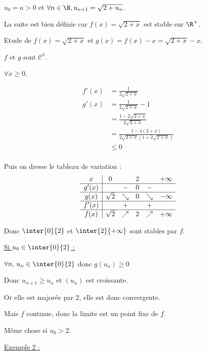 \begin{exemple}
    $u_0 = a > 0$ et $\forall n \in \N, u_{n + 1} = \sqrt{2 + u_n}$. 

    La suite est bien définie car $f(x) = \sqrt{2 + x}$ est stable sur $\R^+$. 

    Etude de $f(x) = \sqrt{2 + x}$ et $g(x)= f(x) - x = \sqrt{2 + x} - x$.

    $f$ et $g$ sont $\mathscr C^1$. 
    
    $\forall x  \geqslant 0,$

    \begin{align*}
        f'(x) & = \frac 1 {2\sqrt{2 + x}} \\
        g'(x) & = \frac 1 {2\sqrt{2 + x}} - 1 \\
        & = \frac{1 - 2 \sqrt{2 + x}}{2 \sqrt{2 + x}} \\
        & = \frac{1 - 4(2 + x)}{2 \sqrt{2 + x}(1 + 2\sqrt{2 + x})} \\
        & \leqslant 0 \\
    \end{align*}
    

    Puis on dresse le tableau de variation :
    \[\begin{array}{c|ccccc}
        x & 0 & & 2 & & +\infty \\
        \hline
        g'(x) & & - & 0 & - & \\
        \hline
        g(x) & \sqrt 2 & \searrow & 0 & \searrow & -\infty \\
        \hline
        f'(x) & \space & + & \space & + & \space \\
        \hline
        f(x) & \sqrt 2 & \nearrow & 2 & \nearrow & +\infty \\
    \end{array}\]

    Donc $\inter{0}{2}$ et $\inter{2}{+\infty}$ sont stables par $f$.

    \avspace \qquad \uline{Si $u_0 \in \inter{0}{2}$ :}

    \avspace $\forall n, \, u_n \in \inter{0}{2}$ donc $g(u_n) \geqslant 0$ 

    Donc $u_{n + 1} \geqslant u_n$ et $(u_n)$ est croissante. 

    Or elle est majorée par 2, elle est donc convergente. 

    Mais $f$ continue, donc la limite est un point fixe de $f$.

    Même chose si $u_0 > 2$. 

    \lvspace \lvspace
    \uline{Exemple 2 :}
    

\end{exemple}
